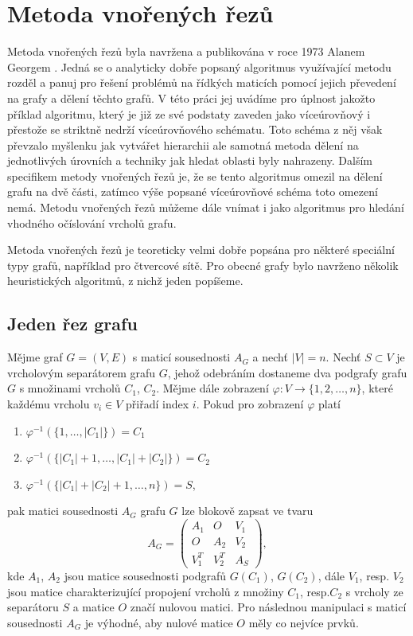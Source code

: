 \documentclass[11pt,american,czech,oneside]{book}
\theoremstyle{plain}
\theoremstyle{definition}
\begin{document}
\section{Metoda vnořených řezů}

Metoda vnořených řezů byla navržena a publikována v roce 1973 Alanem Georgem \cite{geo:73}. Jedná se o analyticky dobře popsaný algoritmus využívající metodu rozděl a panuj pro řešení problémů na řídkých maticích pomocí jejich převedení na grafy a dělení těchto grafů. V této práci jej uvádíme pro úplnost jakožto příklad algoritmu, který je již ze své podstaty zaveden jako víceúrovňový i přestože se striktně nedrží víceúrovňového schématu. Toto schéma z něj však převzalo myšlenku jak vytvářet hierarchii ale samotná metoda dělení na jednotlivých úrovních a techniky jak hledat oblasti byly nahrazeny. Dalším specifikem metody vnořených řezů je, že se tento algoritmus omezil na dělení grafu na dvě části, zatímco výše popsané víceúrovňové schéma toto omezení nemá.
Metodu vnořených řezů můžeme dále vnímat i jako algoritmus pro hledání vhodného očíslování vrcholů grafu.

Metoda vnořených řezů je teoreticky velmi dobře popsána pro některé speciální typy grafů, například pro čtvercové sítě. Pro obecné grafy bylo navrženo několik heuristických algoritmů, z nichž jeden popíšeme.

\subsection{Jeden řez grafu}

Mějme graf $G = (V,E)$ s maticí sousednosti $A_G$ a nechť $|V| = n$. Nechť $S \subset V$ je vrcholovým separátorem grafu $G$, jehož odebráním dostaneme dva podgrafy grafu $G$ s množinami vrcholů $C_1$, $C_2$. Mějme dále zobrazení $\varphi: V \rightarrow \{1, 2, \ldots, n\}$, které každému vrcholu $v_i \in V$ přiřadí index $i$. Pokud pro zobrazení $\varphi$ platí
\begin{enumerate}
  \item $\varphi^{-1}\left(\{1,\ldots,|C_1|\} \right)=C_1$
  \item $\varphi^{-1}\left(\{|C_1|+1,\ldots,|C_1|+|C_2|\}\right)=C_2$
  \item $\varphi^{-1}\left(\{|C_1|+|C_2|+1,\ldots,n\}\right)=S$,
\end{enumerate}
pak matici sousednosti $A_G$ grafu $G$ lze blokově zapsat ve tvaru
\begin{equation}\label{AG nested}
    A_G =
    \left(
        \begin{matrix}
          A_1   & O     & V_1 \\
          O     & A_2   & V_2 \\
          V_1^T & V_2^T & A_S
        \end{matrix}
    \right),
\end{equation}
kde $A_1$, $A_2$ jsou matice sousednosti podgrafů $G(C_1)$, $G(C_2)$, dále $V_1$, resp. $V_2$ jsou matice charakterizující propojení vrcholů z množiny $C_1$, resp.$C_2$ s vrcholy ze separátoru $S$ a matice $O$ značí nulovou matici. Pro následnou manipulaci s maticí sousednosti $A_G$ je výhodné, aby nulové matice $O$ měly co nejvíce prvků.
\end{document}
